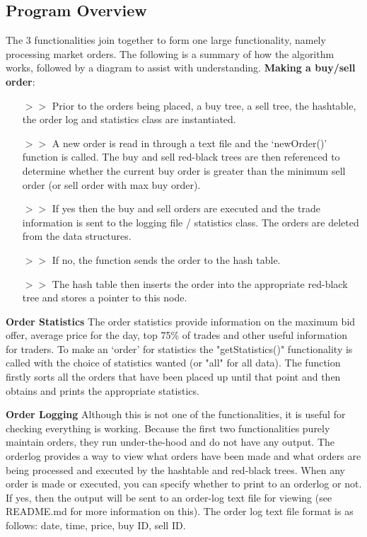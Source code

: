 \documentclass[11p]{article}
\def\nl{\newline}
\begin{document}
\subsection*{Program Overview}
The 3 functionalities join together to form one large functionality, namely processing market orders. The following is a summary of how the algorithm works, followed by a diagram to assist with understanding. \nl
\textbf{Making a buy/sell order}:
\begin{itemize}
    \item[$>>$]Prior to the orders being placed, a buy tree, a sell tree, the hashtable, the order log and statistics class are instantiated.
    \item[$>>$] A new order is read in through a text file and the `newOrder()' function is called. The buy and sell red-black trees are then referenced to determine whether the current buy order is greater than the minimum sell order (or sell order with max buy order).
    \item[$>>$]  If yes then the buy and sell orders are executed and the trade information is sent to the logging file / statistics class. The orders are deleted from the data structures.
    \item[$>>$] If no, the function sends the order to the hash table.
    \item[$>>$] The hash table then inserts the order into the appropriate red-black tree and stores a pointer to this node.
\end{itemize}

\textbf{Order Statistics} \nl
The order statistics provide information on the maximum bid offer, average price for the day, top 75\% of trades and other useful information for traders. To make an `order' for statistics the "getStatistics()" functionality is called with the choice of statistics wanted (or "all" for all data). The function firstly sorts all the orders that have been placed up until that point and then obtains and prints the appropriate statistics.

\bigbreak
\textbf{Order Logging} \nl
Although this is not one of the functionalities, it is useful for checking everything is working. Because the first two functionalities purely maintain orders, they run under-the-hood and do not have any output. The orderlog provides a way to view what orders have been made and what orders are being processed and executed by the hashtable and red-black trees. When any order is made or executed, you can specify whether to print to an orderlog or not. If yes, then the output will be sent to an order-log text file for viewing (see README.md for more information on this). The order log text file format is as follows: date, time, price, buy ID, sell ID.
\bigbreak
\end{document}
